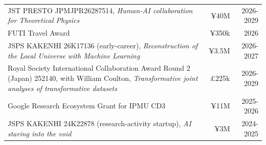 \begin{tabularx}{\linewidth}{Xrr}
  JST PRESTO JPMJPR26287514, \emph{Human-AI collaboration for Theoretical Physics} & ¥40M & 2026-2029 \\
  FUTI Travel Award & ¥350k & 2026 \\
  JSPS KAKENHI 26K17136 (early-career), \emph{Reconstruction of the Local Universe with Machine Learning} & ¥3.5M & 2026-2027 \\
  Royal Society International Collaboration Award Round 2 (Japan) 252140, with William Coulton, \emph{Transformative joint analyses of transformative datasets} & £225k & 2026-2029 \\
  Google Research Ecosystem Grant for IPMU CD3 & ¥11M & 2025-2026 \\
  JSPS KAKENHI 24K22878 (research-activity startup), \emph{AI staring into the void} & ¥3M & 2024-2025 \\
\end{tabularx}

